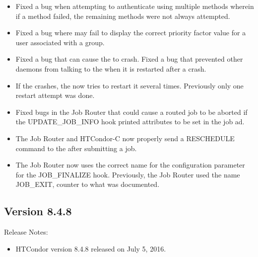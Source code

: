 \begin{itemize}
\item Fixed a bug when attempting to authenticate using multiple
methods wherein if a method failed, the remaining methods were not
always attempted.

\item Fixed a bug where  may fail to display
the correct priority factor value for a user associated
with a group.

\item Fixed a bug that can cause the  to crash.
Fixed a bug that prevented other daemons from talking to the
 when it is restarted after a crash.

\item If the  crashes, the  now tries to
restart it several times. Previously only one restart attempt was done.

\item Fixed bugs in the Job Router that could cause a routed job to be
aborted if the UPDATE\_JOB\_INFO hook printed attributes to be set in
the job ad.

\item The Job Router and HTCondor-C now properly send a RESCHEDULE
command to the  after submitting a job.

\item The Job Router now uses the correct name for the configuration
parameter for the JOB\_FINALIZE hook.
Previously, the Job Router used the name JOB\_EXIT, counter to what was
documented.

\end{itemize}

\subsection*{\label{sec:New-8-4-8}Version 8.4.8}

\noindent Release Notes:

\begin{itemize}

\item HTCondor version 8.4.8 released on July 5, 2016.

\end{itemize}


